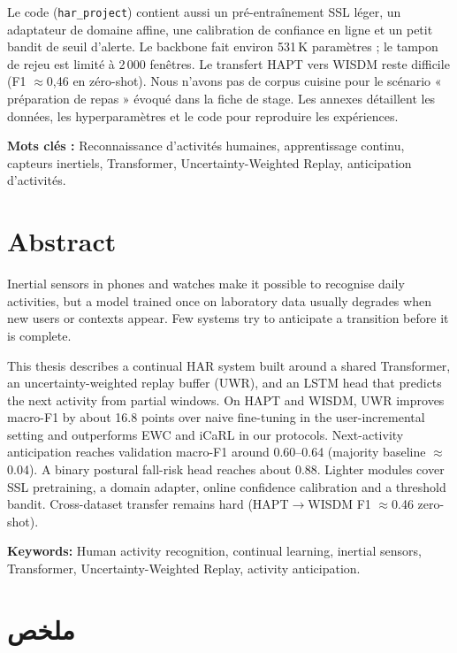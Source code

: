 \documentclass[a4paper,12pt]{report}
\newcommand{\mychapter}[2]{%
  \chapter*{#2}
  \markboth{#2}{#2}
  \addcontentsline{toc}{chapter}{#2}
}
\begin{document}
Le code (\texttt{har\_project}) contient aussi un pré-entraînement SSL léger,
un adaptateur de domaine affine, une calibration de confiance en ligne et un
petit bandit de seuil d'alerte. Le backbone fait environ 531\,K paramètres ;
le tampon de rejeu est limité à 2\,000 fenêtres. Le transfert HAPT vers WISDM
reste difficile (F1 $\approx$0,46 en zéro-shot). Nous n'avons pas de corpus
cuisine pour le scénario « préparation de repas » évoqué dans la fiche de
stage. Les annexes détaillent les données, les hyperparamètres et le code
pour reproduire les expériences.

\bigskip
\noindent\textbf{Mots clés :} Reconnaissance d'activités humaines, apprentissage
continu, capteurs inertiels, Transformer, Uncertainty-Weighted Replay, anticipation
d'activités.

\clearpage

\mychapter{0}{Abstract}


Inertial sensors in phones and watches make it possible to recognise daily
activities, but a model trained once on laboratory data usually degrades when
new users or contexts appear. Few systems try to anticipate a transition
before it is complete.

This thesis describes a continual HAR system built around a shared Transformer,
an uncertainty-weighted replay buffer (UWR), and an LSTM head that predicts the
next activity from partial windows. On HAPT and WISDM, UWR improves macro-F1 by
about 16.8 points over naive fine-tuning in the user-incremental setting and
outperforms EWC and iCaRL in our protocols. Next-activity anticipation reaches
validation macro-F1 around 0.60--0.64 (majority baseline $\approx$0.04). A
binary postural fall-risk head reaches about 0.88. Lighter modules cover SSL
pretraining, a domain adapter, online confidence calibration and a threshold
bandit. Cross-dataset transfer remains hard (HAPT$\rightarrow$WISDM F1
$\approx$0.46 zero-shot).

\bigskip
\noindent\textbf{Keywords:} Human activity recognition, continual learning, inertial
sensors, Transformer, Uncertainty-Weighted Replay, activity anticipation.

\clearpage

\chapter*{\hfill \textarabic{ملخص}}
\end{document}

